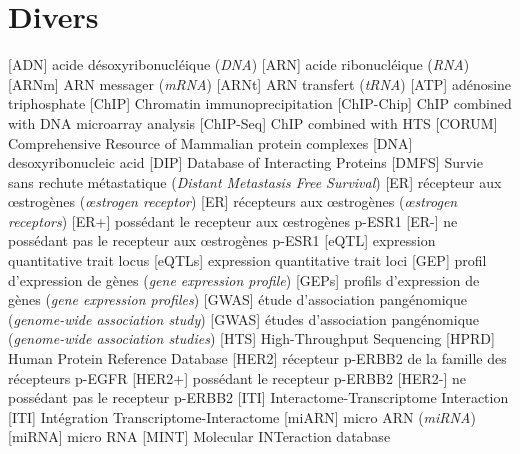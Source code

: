 	\section{\textcolor{white!15!black}{Divers}}
		\begin{acronym}[CDKN2A]
						[ADN]		{acide désoxyribonucléique (\emph{\acs{DNA}})}
						[ARN]		{acide ribonucléique (\emph{\acs{RNA}})}
						[ARNm]		{\acs{ARN} messager (\emph{\acs{mRNA}})}
						[ARNt]		{\acs{ARN} transfert (\emph{\acs{tRNA}})}
						[ATP]		{adénosine triphosphate}
						[ChIP]		{Chromatin immunoprecipitation}
				{\acs{ChIP} combined with DNA microarray analysis}
					[ChIP-Seq]	{\acs{ChIP} combined with \acs{HTS}}
						[CORUM]		{Comprehensive Resource of Mammalian protein complexes}
						[DNA]		{desoxyribonucleic acid}
						[DIP]		{Database of Interacting Proteins}
						[DMFS]		{Survie sans rechute métastatique (\emph{Distant Metastasis Free Survival})}
						[ER]		{récepteur aux {\oe}strogènes (\emph{{\oe}strogen receptor})}
					{récepteurs aux {\oe}strogènes (\emph{{\oe}strogen receptors})}
						[ER+]		{possédant le recepteur aux {\oe}strogènes \acs{p-ESR1}}
						[ER-]		{ne possédant pas le recepteur aux {\oe}strogènes \acs{p-ESR1}}
						[eQTL]		{expression quantitative trait locus}
						[eQTLs]		{expression quantitative trait loci}
						[GEP]		{profil d'expression de gènes (\emph{gene expression profile})}
					{profils d'expression de gènes (\emph{gene expression profiles})}
						[GWAS]		{étude d'association pangénomique (\emph{genome-wide association study})}
					{études d'association pangénomique (\emph{genome-wide association studies})}
						[HTS]		{High-Throughput Sequencing}
						[HPRD]		{Human Protein Reference Database}
						[HER2]		{récepteur \acs{p-ERBB2} de la famille des récepteurs \acs{p-EGFR}}
						[HER2+]		{possédant le recepteur \acs{p-ERBB2}}
						[HER2-]		{ne possédant pas le recepteur \acs{p-ERBB2}}
						[ITI]		{Interactome-Transcriptome Interaction}
						[ITI]		{Intégration Transcriptome-Interactome}
						[miARN]		{micro \acs{ARN} (\emph{\ac{miRNA}})}
						[miRNA]		{micro \acs{RNA}}
						[MINT]		{Molecular INTeraction database}

\end{acronym}
